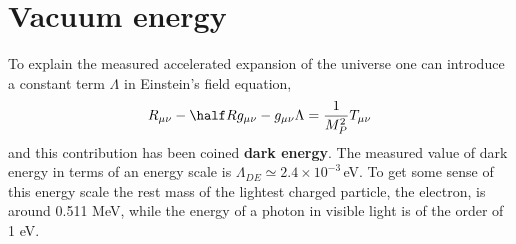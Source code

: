 \documentclass[notes.tex]{subfiles}
\begin{document}
%
%



\section{Vacuum energy}
\label{sec:vacuum_energy}
To explain the measured accelerated expansion of the universe one can introduce a constant term $\Lambda$ in Einstein's field equation, 
\begin{equation}
R_{\mu\nu}-\half R g_{\mu\nu}-g_{\mu\nu}\Lambda = \frac{1}{M_P^2}T_{\mu\nu}
\end{equation}
and this contribution has been coined {\bf dark energy}. 
The measured value of dark energy in terms of an energy scale is $\Lambda_{DE} \simeq 2.4\times 10^{-3}$\,eV. To get some sense of this energy scale the rest mass of the lightest charged particle, the electron, is around 0.511 MeV, while the energy of a photon in visible light is of the order of 1 eV.
\end{document}
